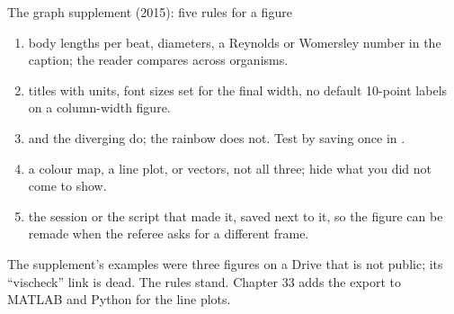 \documentclass[aspectratio=169,11pt]{beamer}
\begin{document}
\begin{frame}{The graph supplement (2015): five rules for a figure}
\label{fr:graph}
\footnotesize
\begin{enumerate}
  \item {} body lengths per beat, diameters, a Reynolds or Womersley number in the caption; the reader compares across organisms.
  \item {} titles with units, font sizes set for the final width, no default 10-point labels on a column-width figure.
  \item {}  and the diverging  do; the rainbow does not. Test by saving once in .
  \item {} a colour map, a line plot, or vectors, not all three; hide what you did not come to show.
  \item {} the session or the script that made it, saved next to it, so the figure can be remade when the referee asks for a different frame.
\end{enumerate}
\begin{punchbox}
\scriptsize The supplement's examples were three figures on a Drive that is not public; its ``vischeck'' link is dead. The rules stand. Chapter 33 adds the export to MATLAB and Python for the line plots.
\end{punchbox}
\end{frame}
\end{document}

